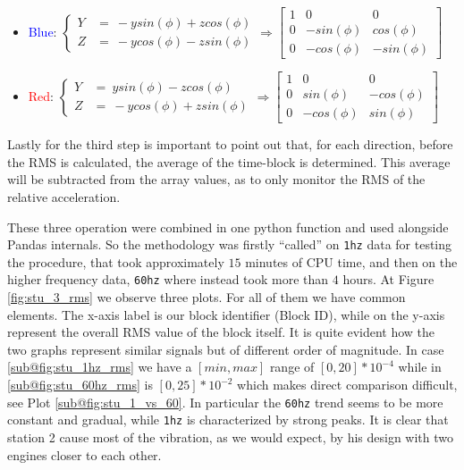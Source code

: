 \begin{itemize}
    \item \textcolor{blue}{Blue}: \( \left\{ 
        \begin{array}{cl} 
            Y & = \ -y sin(\phi) + z cos(\phi) \\
            Z & = \ -y cos(\phi) - z sin(\phi) 
        \end{array} \right. 
        \Rightarrow  
        \begin{bmatrix}
            1 & 0 & 0 \\
            0 & -sin(\phi) & cos(\phi)  \\
            0 & -cos(\phi) & -sin(\phi)  
        \end{bmatrix} \)
    \item \textcolor{red}{Red}: \( \left\{ 
        \begin{array}{cl}
            Y & = \ y sin(\phi) - z cos(\phi) \\
            Z & = \ -y cos(\phi) + z sin(\phi) 
        \end{array} \right. 
        \Rightarrow
        \begin{bmatrix}
            1 & 0 & 0 \\
            0 & sin(\phi) & -cos(\phi)  \\
            0 & -cos(\phi) & sin(\phi)  
        \end{bmatrix} \)
\end{itemize}
Lastly for the third step is important to point out that, for each direction, before the RMS is calculated, the average of the time-block is determined. 
This average will be subtracted from the array values, as to only monitor the RMS of the relative acceleration.

These three operation were combined in one python function and used alongside Pandas internals. So the methodology was firstly ``called'' on \texttt{1hz} data for testing the procedure, that took approximately $15$ minutes of CPU time, 
and then on the higher frequency data, \texttt{60hz} where instead took more than $4$ hours. At Figure \ref{fig:stu_3_rms} we observe three plots.
For all of them we have common elements. The x-axis label is our block identifier (Block ID), while on the y-axis represent the overall RMS value of the block itself. 
It is quite evident how the two graphs represent similar signals but of different order of magnitude. In case \ref{sub@fig:stu_1hz_rms} we have a $[min, max]$ range of $[0,20] * 10^{-4}$ 
while in \ref{sub@fig:stu_60hz_rms} is $[0,25] * 10^{-2}$ which makes direct comparison difficult, see Plot \ref{sub@fig:stu_1_vs_60}.
In particular the \texttt{60hz} trend seems to be more constant and gradual, while \texttt{1hz} is characterized by strong peaks. It is clear that station 2 cause most of the vibration, 
as we would expect, by his design with two engines closer to each other.

